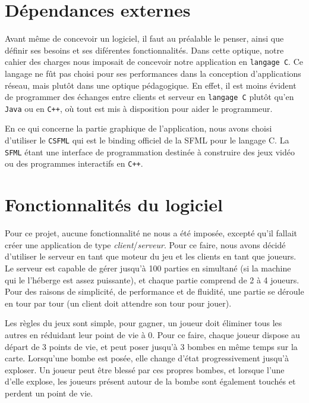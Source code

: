 \section*{Dépendances externes}

	Avant même de concevoir un logiciel, il faut au préalable le penser, ainsi que définir ses besoins et ses diférentes fonctionnalités. Dans cette optique, notre cahier des charges nous imposait de concevoir notre application en \texttt{langage C}. Ce langage ne fût pas choisi pour ses performances dans la conception d'applications réseau, mais plutôt dans une optique pédagogique. En effet, il est moins évident de programmer des échanges entre clients et serveur en \texttt{langage C} plutôt qu'en \texttt{Java} ou en \texttt{C++}, où tout est mis à disposition pour aider le programmeur.

\vspace{0.5cm}

	En ce qui concerne la partie graphique de l'application, nous avons choisi d'utiliser le \texttt{CSFML} qui est le binding officiel de la SFML pour le langage C. La \texttt{SFML} étant une interface de programmation destinée à construire des jeux vidéo ou des programmes interactifs en \texttt{C++}.

\section*{Fonctionnalités du logiciel}

	Pour ce projet, aucune fonctionnalité ne nous a été imposée, excepté qu'il fallait créer une application de type \textit{client}/\textit{serveur}. Pour ce faire, nous avons décidé d'utiliser le serveur en tant que moteur du jeu et les clients en tant que joueurs. Le serveur est capable de gérer jusqu'à 100 parties en simultané (si la machine qui le l'héberge est assez puissante), et chaque partie comprend de 2 à 4 joueurs. Pour des raisons de simplicité, de performance et de fluidité, une partie se déroule en tour par tour (un client doit attendre son tour pour jouer). 

\vspace{0.5cm}

	Les règles du jeux sont simple, pour gagner, un joueur doit éliminer tous les autres en réduidant leur point de vie à 0. Pour ce faire, chaque joueur dispose au départ de 3 points de vie, et peut poser jusqu'à 3 bombes en même temps sur la carte. Lorsqu'une bombe est posée, elle change d'état progressivement jusqu'à exploser. Un joueur peut être blessé par ces propres bombes, et lorsque l'une d'elle explose, les joueurs présent autour de la bombe sont également touchés et perdent un point de vie.

